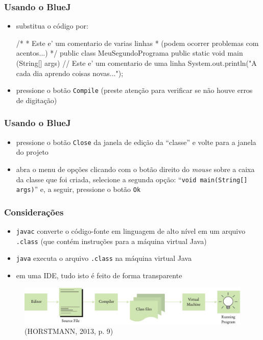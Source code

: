 \documentclass[aspectratio=169]{beamer}
\begin{document}
\begin{frame}[fragile]\frametitle{Usando o BlueJ}
\begin{itemize}
	\item substitua o código por:
\begin{javacode}
/*
 * Este e' um comentario de varias linhas
 * (podem ocorrer problemas com acentos...)
 */
public class MeuSegundoPrograma {
  public static void main (String[] args) {
    // Este e' um comentario de uma linha
    System.out.println("A cada dia aprendo coisas novas...");
  }
}
\end{javacode}
	\item pressione o botão \texttt{Compile} (preste atenção para verificar se não houve erros de digitação)
\end{itemize}
\end{frame}

\begin{frame}\frametitle{Usando o BlueJ}
\begin{itemize}
	\item pressione o botão \texttt{Close} da janela de edição da ``classe'' e volte para a janela do projeto
	\item abra o menu de opções clicando com o botão direito do \emph{mouse} sobre a caixa da classe que foi criada, selecione a segunda opção: ``\texttt{void main(String[] args)}'' e, a seguir, pressione o botão \texttt{Ok}
\end{itemize}
\end{frame}

\begin{frame}\frametitle{Considerações}
\begin{itemize}
	\item \texttt{javac} converte o código-fonte em linguagem de alto nível em um arquivo \texttt{.class} (que contém instruções para a máquina virtual Java)
	\item \texttt{java} executa o arquivo \texttt{.class} na máquina virtual Java
	\item em uma IDE, tudo isto é feito de forma transparente
\end{itemize}
\begin{figure}[h]
\centering
\includegraphics[height=0.25\paperheight]{pucrs-ep-fprog-unidade_01-introducao-laminas-compilacao.jpg}\\
(HORSTMANN, 2013, p. 9)
\end{figure}
\end{frame}
\end{document}
